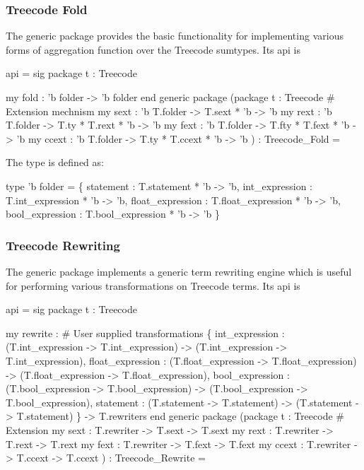 \subsubsection{Treecode Fold}
The generic package 
provides the basic functionality for implementing various forms of
aggregation function over the Treecode sumtypes.  Its api is
\begin{SML}
api  =
sig
   package t : Treecode

   my fold : 'b folder -> 'b folder
end
generic package 
  (package t : Treecode
   #  Extension mechnism 
   my sext  : 'b T.folder -> T.sext * 'b -> 'b
   my rext  : 'b T.folder -> T.ty * T.rext * 'b -> 'b
   my fext  : 'b T.folder -> T.fty * T.fext * 'b -> 'b
   my ccext : 'b T.folder -> T.ty * T.ccext * 'b -> 'b
  ) : Treecode_Fold =
\end{SML}
The type  is defined as:
\begin{SML}
   type 'b folder =
       \{ statement   : T.statement * 'b -> 'b,
         int_expression  : T.int_expression * 'b -> 'b,
         float_expression  : T.float_expression * 'b -> 'b, 
         bool_expression : T.bool_expression * 'b -> 'b
       \}
\end{SML}


\subsubsection{Treecode Rewriting}

The generic package 
implements a generic term rewriting engine which is useful for performing
various transformations on Treecode terms. Its api is
\begin{SML}
api  =
sig
   package t : Treecode

  my rewrite : 
       #  User supplied transformations 
       \{ int_expression  : (T.int_expression -> T.int_expression) -> (T.int_expression -> T.int_expression), 
         float_expression  : (T.float_expression -> T.float_expression) -> (T.float_expression -> T.float_expression),
         bool_expression : (T.bool_expression -> T.bool_expression) -> (T.bool_expression -> T.bool_expression),
         statement   : (T.statement -> T.statement) -> (T.statement -> T.statement)
       \} -> T.rewriters
end
generic package 
  (package t : Treecode
   #  Extension 
   my sext : T.rewriter -> T.sext -> T.sext
   my rext : T.rewriter -> T.rext -> T.rext
   my fext : T.rewriter -> T.fext -> T.fext
   my ccext : T.rewriter -> T.ccext -> T.ccext
  ) : Treecode_Rewrite =
\end{SML}

